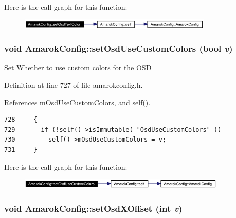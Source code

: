Here is the call graph for this function:\begin{figure}[H]
\begin{center}
\leavevmode
\includegraphics[width=261pt]{classAmarokConfig_AmarokConfige77_cgraph}
\end{center}
\end{figure}
\subsubsection{\setlength{\rightskip}{0pt plus 5cm}void Amarok\-Config::set\-Osd\-Use\-Custom\-Colors (bool {\em v})\hspace{0.3cm}{\tt  [inline, static]}}\label{classAmarokConfig_AmarokConfige75}


Set Whether to use custom colors for the OSD 

Definition at line 727 of file amarokconfig.h.

References m\-Osd\-Use\-Custom\-Colors, and self().



\footnotesize\begin{verbatim}728     {
729       if (!self()->isImmutable( "OsdUseCustomColors" ))
730         self()->mOsdUseCustomColors = v;
731     }
\end{verbatim}\normalsize 


Here is the call graph for this function:\begin{figure}[H]
\begin{center}
\leavevmode
\includegraphics[width=280pt]{classAmarokConfig_AmarokConfige75_cgraph}
\end{center}
\end{figure}
\subsubsection{\setlength{\rightskip}{0pt plus 5cm}void Amarok\-Config::set\-Osd\-XOffset (int {\em v})\hspace{0.3cm}{\tt  [inline, static]}}\label{classAmarokConfig_AmarokConfige83}


